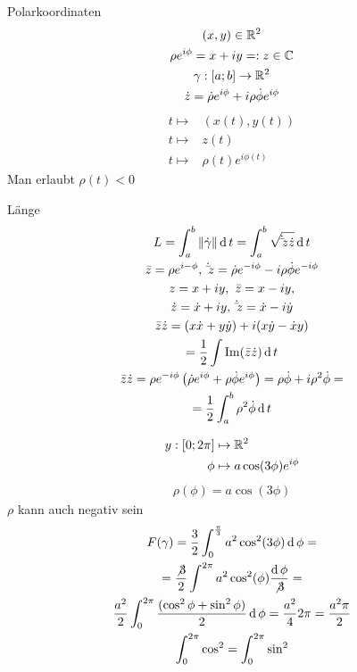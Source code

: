 \begin{Bem}
  Polarkoordinaten
  \begin{gather*}
    (x,y)\in\mathbb{R}^2\\
    \rho e^{i\phi} = x+iy=:z\in\mathbb{C}\\
    \gamma:[a;b]\to\mathbb{R}^2\\
    \dot z= \dot \rho e^{i\phi}+i\rho\dot\phi e^{i\phi}
  \end{gather*}
  \begin{align*}
    t\mapsto& (x(t),y(t))\\
    t\mapsto&z(t)\\
    t\mapsto&\rho(t)e^{i\phi(t)}
  \end{align*}
  Man erlaubt $\rho(t)<0$
\end{Bem}
\begin{Bem}{Länge}
  \begin{gather*}
    L=\int_a^b\left\| \dot \gamma \right\|\operatorname{d} t=\int^b_a\sqrt{\dot\bar z\dot z}\operatorname{d} t\\
    \bar z=\rho e^{i-\phi},\ \dot\bar z=\dot\rho e^{-i\phi}-i\rho\dot\phi e^{-i\phi}\\
    z=x+iy,\ \bar z=x-iy,\\
    \dot z=\dot x+iy,\ \dot\bar z=\dot x-i\dot y\\
    \bar z\dot z=(x\dot x+y\dot y)+i(x\dot y-\dot xy)\\
    =\frac{1}{2}\int\operatorname{Im}(\bar z\dot z)\operatorname{d} t\\
    \bar z\dot z=\rho e^{-i\phi}\left(\dot \rho e^{i\phi}+ \rho\dot\phi e^{i\phi}\right) = \rho\dot\phi+i\rho^2\dot\phi=\\
    =\frac{1}{2}\int^b_a\rho^2\dot\phi\operatorname{d} t
  \end{gather*}
\end{Bem}
\begin{Bsp}
  \begin{align*}
    y:[0;2\pi]&\mapsto\mathbb{R}^2\\
    \phi&\mapsto a\cos(3\phi)e^{i\phi}\\
  \end{align*}
  \begin{align*}
    \rho(\phi)=a\cos(3\phi)
  \end{align*}
  $\rho$ kann auch negativ sein
  \begin{gather*}
    F(\gamma)=\frac{3}{2}\int_0^{\frac{\pi}{3}}a^2\cos^2(3\phi)\operatorname{d}\phi =\\
    =\frac{\not 3}{2}\int^{2\pi}a^2\cos^2(\phi)\frac{\operatorname{d} \phi}{\not 3}=\\
    \frac{a^2}{2}\int^{2\pi}_0\frac{(\cos^2\phi+\sin^2\phi)}{2}\operatorname{d} \phi=\frac{a^2}{4}2\pi=\frac{a^2\pi}{2}\\
    \int^{2\pi}_0\cos^2=\int_0^{2\pi}\sin^2
  \end{gather*}
\end{Bsp}
